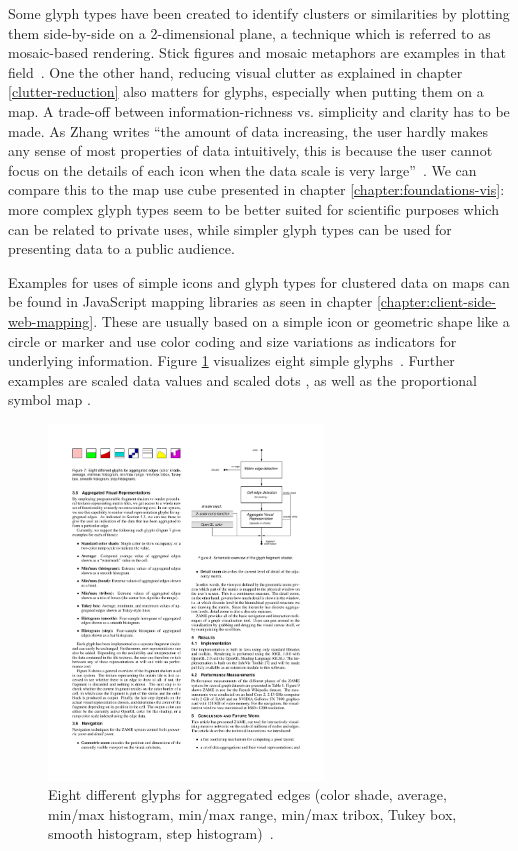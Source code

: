 \begin{itemize}
Some glyph types have been created to identify clusters or similarities by plotting them side-by-side on a 2-dimensional plane, a technique which is referred to as mosaic-based rendering. Stick figures and mosaic metaphors are examples in that field~\cite{stickfigures, nocke05mosaic}. One the other hand, reducing visual clutter as explained in chapter \ref{clutter-reduction} also matters for glyphs, especially when putting them on a map. A trade-off between information-richness vs. simplicity and clarity has to be made. As Zhang writes ``the amount of data increasing, the user hardly makes any sense of most properties of data intuitively, this is because the user cannot focus on the details of each icon when the data scale is very large''~\cite{zhang07thesis}. We can compare this to the map use cube presented in chapter \ref{chapter:foundations-vis}: more complex glyph types seem to be better suited for scientific purposes which can be related to private uses, while simpler glyph types can be used for presenting data to a public audience.

Examples for uses of simple icons and glyph types for clustered data on maps can be found in JavaScript mapping libraries as seen in chapter \ref{chapter:client-side-web-mapping}. These are usually based on a simple icon or geometric shape like a circle or marker and use color coding and size variations as indicators for underlying information. Figure \ref{fig:glyphs-zame} visualizes eight simple glyphs~\cite{ElmqvistDGHF08}. Further examples are scaled data values and scaled dots \cite{web:scaled-data-value}, as well as the proportional symbol map \cite{vislecture}.

\begin{figure}[h]
  \begin{center}
    \includegraphics[width=0.65\textwidth]{figures/glyphs_zame.pdf}
    \caption{Eight different glyphs for aggregated edges (color shade,
average, min/max histogram, min/max range, min/max tribox, Tukey
box, smooth histogram, step histogram)~\cite{ElmqvistDGHF08}.}
    \label{fig:glyphs-zame}
  \end{center}
\end{figure}



\end{itemize}
